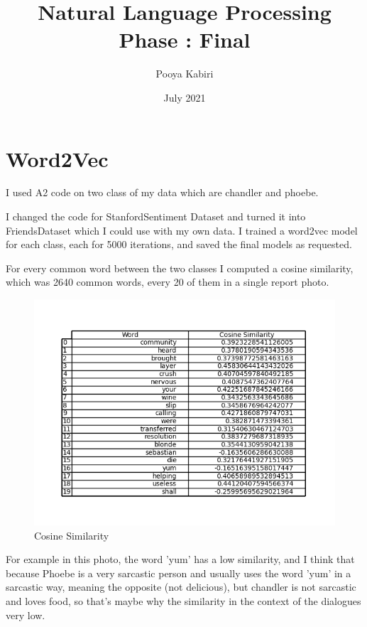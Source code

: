 \documentclass{article}
\title{Natural Language Processing\\Phase \No3: Final}
\date{July 2021}
\author{Pooya Kabiri}
\affil{Department of Computer Science}
\affil{Iran University of Science and Technology}
\begin{document}
\maketitle

{
\hypersetup{linkcolor=black}
\tableofcontents
\listoffigures
{}
}
\pagebreak

\section{Word2Vec}
\par I used A2 code on two class of my data which are chandler and phoebe.
\par I changed the code for StanfordSentiment Dataset and turned it into FriendsDataset which I could use with my own data. I trained a word2vec model for each class, each for 5000 iterations, and saved the final models as requested.

\par For every common word between the two classes I computed a cosine similarity, which was 2640 common words, every 20 of them in a single report photo.

\begin{figure}[H]
    \centering
    \includegraphics[width=1\linewidth]{../reports/word2vec/common_words_122.png}
    \caption{Cosine Similarity}
\end{figure}

\par For example in this photo, the word 'yum' has a low similarity, and I think that because Phoebe is a very sarcastic person and usually uses the word 'yum' in a sarcastic way, meaning the opposite (not delicious), but chandler is not sarcastic and loves food, so that's maybe why the similarity in the context of the dialogues very low.
\end{document}
